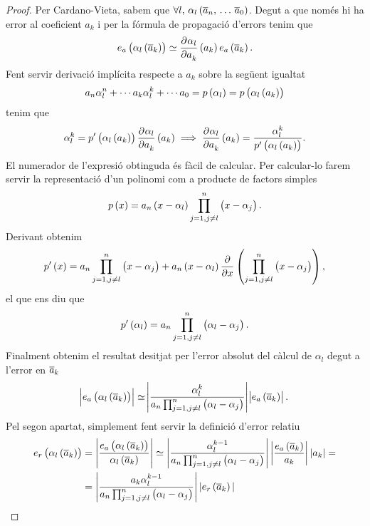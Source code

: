 \begin{proof}
  Per Cardano-Vieta, sabem que $\forall l,\, \alpha_l\left(\overline{a}_n,\,\dots\,\overline{a}_0\right)$. Degut a que només hi ha error al coeficient $a_k$ i per la fórmula de propagació d'errors tenim que
  \[
    e_a\left( \alpha_l\left( \overline{a}_k\right) \right)  \simeq \frac{\partial^{} \alpha_l}{\partial a_k^{}}\left( a_k\right) e_a\left( \overline{a}_k\right) .
  \]
  Fent servir derivació implícita respecte a $a_k$ sobre la següent igualtat
  \[
     a_n\alpha_l^n + \cdots a_k\alpha_l^k + \cdots a_0 = p\left( \alpha_l\right)  = p\left( \alpha_l\left( a_k\right) \right) 
  \]
  tenim que
  \[
    \alpha_l^k = p'\left( \alpha_l\left( a_k\right) \right) \frac{\partial^{} \alpha_l}{\partial a_k^{}}\left( a_k\right)  \implies \frac{\partial^{} \alpha_l}{\partial a_k^{}}\left( a_k\right)  = \dfrac{\alpha_l^k}{p'\left( \alpha_l\left( a_k\right) \right)}.
  \]
  El numerador de l'expresió obtinguda és fàcil de calcular. Per calcular-lo farem servir la representació d'un polinomi com a producte de factors simples
  \[
      p\left( x\right) = a_n\left( x-\alpha_l\right) \prod_{j=1,j\neq l}^{n}\left( x-\alpha_j\right).
  \]
  Derivant obtenim
  \[
    p'\left( x\right)  = a_n\prod_{j=1,j\neq l}^{n}\left( x-\alpha_j\right)  + a_n\left( x-\alpha_l\right) \frac{\partial}{\partial x}\left( \prod_{j=1,j\neq l}^{n}\left( x-\alpha_j\right)\right),
  \]
  el que ens diu que
  \[
    p'\left( \alpha_l\right) = a_n\prod_{j=1,j\neq l}^{n}\left( \alpha_l-\alpha_j\right).
  \]
  Finalment obtenim el resultat desitjat per l'error absolut del càlcul de $\alpha_l$ degut a l'error en $\overline{a}_k$
  \[
    \abs{e_a\left( \alpha_l\left( \overline{a}_k\right) \right)} \simeq \abs{\frac{\alpha_l^k}{ a_n\prod_{j=1,j\neq l}^{n}\left( \alpha_l-\alpha_j\right) }}\abs{e_a\left( \overline{a}_k\right)}.
  \]
  Pel segon apartat, simplement fent servir la definició d'error relatiu 
  \begin{align*}
    e_r\left( \alpha_l\left( \overline{a}_k\right) \right) & = \left|\frac{e_a\left( \alpha_l\left( \overline{a}_k\right) \right) }{\alpha_l\left( \overline{a}_k\right) }\right| \simeq \left|\frac{\alpha_l^{k-1}}{ a_n\prod_{j=1,j\neq l}^{n}\left( \alpha_l-\alpha_j\right) }\right|\left|\frac{e_a\left( \overline{a}_k\right) }{a_k}\right||a_k|=\\
           & = \left|\frac{a_k\alpha_l^{k-1}}{a_n\prod_{j=1,j\neq l}^{n}\left( \alpha_l-\alpha_j\right) }\right| |e_r\left( \overline{a}_k\right) |
  \end{align*}


\end{proof}

